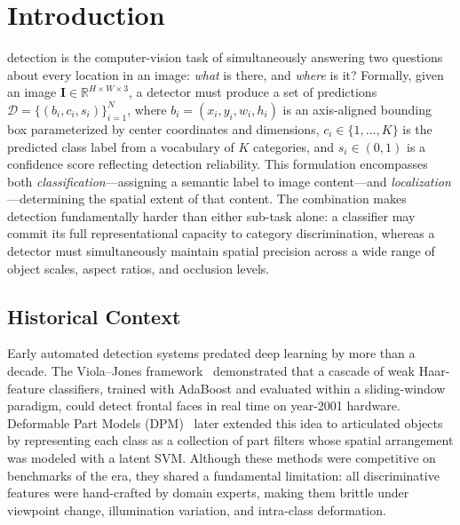 \section{Introduction}
\label{sec:introduction}

 detection is the computer-vision task
of simultaneously answering two questions about every location
in an image: \textit{what} is there, and \textit{where} is it?
Formally, given an image $\mathbf{I} \in \mathbb{R}^{H \times W
\times 3}$, a detector must produce a set of predictions
$\mathcal{D} = \{(b_i, c_i, s_i)\}_{i=1}^{N}$, where $b_i =
(x_i, y_i, w_i, h_i)$ is an axis-aligned bounding box
parameterized by center coordinates and dimensions, $c_i \in
\{1,\ldots,K\}$ is the predicted class label from a vocabulary
of $K$ categories, and $s_i \in (0,1)$ is a confidence score
reflecting detection reliability.  This formulation encompasses
both \textit{classification}---assigning a semantic label to
image content---and \textit{localization}---determining the
spatial extent of that content.  The combination makes
detection fundamentally harder than either sub-task alone: a
classifier may commit its full representational capacity to
category discrimination, whereas a detector must simultaneously
maintain spatial precision across a wide range of object
scales, aspect ratios, and occlusion levels.

\subsection{Historical Context}

Early automated detection systems predated deep learning by
more than a decade.  The Viola--Jones
framework~\cite{viola2001rapid} demonstrated that a cascade of
weak Haar-feature classifiers, trained with AdaBoost and
evaluated within a sliding-window paradigm, could detect
frontal faces in real time on year-2001 hardware.  Deformable
Part Models (DPM)~\cite{felzenszwalb2010object} later extended
this idea to articulated objects by representing each class as
a collection of part filters whose spatial arrangement was
modeled with a latent SVM.  Although these methods were
competitive on benchmarks of the era, they shared a fundamental
limitation: all discriminative features were hand-crafted by
domain experts, making them brittle under viewpoint change,
illumination variation, and intra-class deformation.

